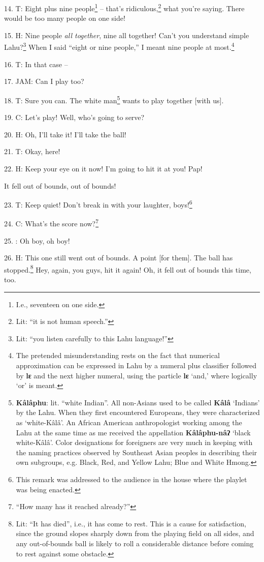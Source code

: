 14. T:  Eight plus nine people\footnote{I.e., seventeen on one side.}
-- that's ridiculous,\footnote{Lit: ``it is not human speech.''} what you're saying. There would be too many people on
one side!

15. H: Nine people \textit{all together}, nine all together! Can't you understand
simple Lahu?\footnote{Lit: ``you listen carefully to this Lahu language!''} When I said ``eight or nine people,'' I meant
nine people at most.\footnote{The pretended misunderstanding rests on the fact that numerical approximation can be expressed in Lahu by a numeral plus classifier followed by \textbf{lɛ} and the next higher numeral, using the particle \textbf{lɛ} `and,' where logically `or' is meant.}

16. T: In that case --

17. JAM: Can I play too?

18. T: Sure you can. The white man\footnote{\textbf{Kâlâphu}: lit. ``white Indian''. All non-Asians used to be called \textbf{Kâlâ} `Indians' by the Lahu. When they first encountered Europeans, they were characterized as `white-Kâlâ'. An African American anthropologist working among the Lahu at the same time as me received the appellation \textbf{Kâlâphu-nâʔ} `black white-Kâlâ'. Color designations for foreigners are very much in keeping with the naming practices observed by Southeast Asian peoples in describing their own subgroups, e.g. Black, Red, and Yellow Lahu; Blue and White Hmong.} wants to play together [with us].

19. C: Let's play! Well, who's going to serve?

20. H: Oh, I'll take it! I'll take the ball!

21. T: Okay, here!

22. H: Keep your eye on it now! I'm going to hit it at you! Pap!


It fell out of bounds, out of bounds!

23. T: Keep quiet! Don't break in with your laughter, boys!\footnote{This remark was addressed to the audience in the house where the playlet was being enacted.}

24. C: What's the score now?\footnote{``How many has it reached already?''}

25. : Oh boy, oh boy!

26. H: This one still went out of bounds. A point [for them]. The ball has stopped.\footnote{Lit: ``It has died'', i.e., it has come to rest. This is a cause for satisfaction, since the ground slopes sharply down from the playing field on all sides, and any out-of-bounds ball is likely to roll a considerable distance before coming to rest against some obstacle.}
Hey, again, you guys, hit it again! Oh, it fell out of bounds this time, too.

